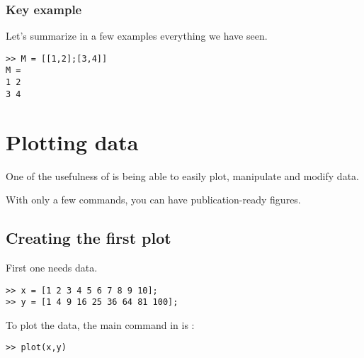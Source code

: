 	\subsection{Key example}
		Let's summarize in a few examples everything we have seen.
\begin{lstlisting}
>> M = [[1,2];[3,4]]
M = 
1 2 
3 4
\end{lstlisting}








\chapter{Plotting data}
One of the usefulness of \matlab is being able to easily plot, manipulate and modify data.

With only a few commands, you can have publication-ready figures.


\section{Creating the first plot}
	First one needs data.
\begin{lstlisting}
>> x = [1 2 3 4 5 6 7 8 9 10];
>> y = [1 4 9 16 25 36 64 81 100];
\end{lstlisting}
	To plot the data, the main command in \matlab is :
\begin{lstlisting}
>> plot(x,y)
\end{lstlisting}



